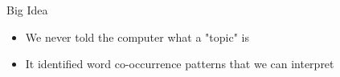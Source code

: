 \documentclass[10pt]{beamer}
\begin{document}

\begin{frame}{Big Idea}
\begin{itemize}
\item We never told the computer what a "topic" is
\item It identified word co-occurrence patterns that we can interpret
\end{itemize}

\vspace{4mm}

\end{frame}

\end{document}
